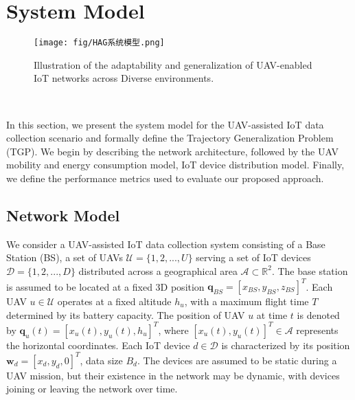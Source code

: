\documentclass[10pt,conference,letterpaper]{IEEEtran}
\begin{document}



\section{System Model}
\begin{figure}[!t]
    \centering
    \texttt{[image: fig/HAG系统模型.png]}
    \caption{Illustration of the adaptability and generalization of UAV-enabled IoT networks across Diverse environments.}
    \label{fig:trajectory_generalization}
\end{figure} 



In this section, we present the system model for the UAV-assisted IoT data collection scenario and formally define the Trajectory Generalization Problem (TGP). We begin by describing the network architecture, followed by the UAV mobility and energy consumption model, IoT device distribution model. Finally, we define the performance metrics used to evaluate our proposed approach.

\subsection{Network Model}

We consider a UAV-assisted IoT data collection system consisting of a Base Station (BS), a set of UAVs $\mathcal{U} = \{1,2,...,U\}$ serving a set of IoT devices $\mathcal{D} = \{1,2,...,D\}$ distributed across a geographical area $\mathcal{A} \subset \mathbb{R}^2$. The base station is assumed to be located at a fixed 3D position $\mathbf{q}_{BS} = [x_{BS}, y_{BS}, z_{BS}]^T$. Each UAV $u \in \mathcal{U}$ operates at a fixed altitude $h_u$, with a maximum flight time $T$ determined by its battery capacity. The position of UAV $u$ at time $t$ is denoted by $\mathbf{q}_u(t) = [x_u(t), y_u(t), h_u]^T$, where $[x_u(t), y_u(t)]^T \in \mathcal{A}$ represents the horizontal coordinates. Each IoT device $d \in \mathcal{D}$ is characterized by its position $\mathbf{w}_d = [x_d, y_d, 0]^T$, data size $B_d$. The devices are assumed to be static during a UAV mission, but their existence in the network may be dynamic, with devices joining or leaving the network over time.
\end{document}
